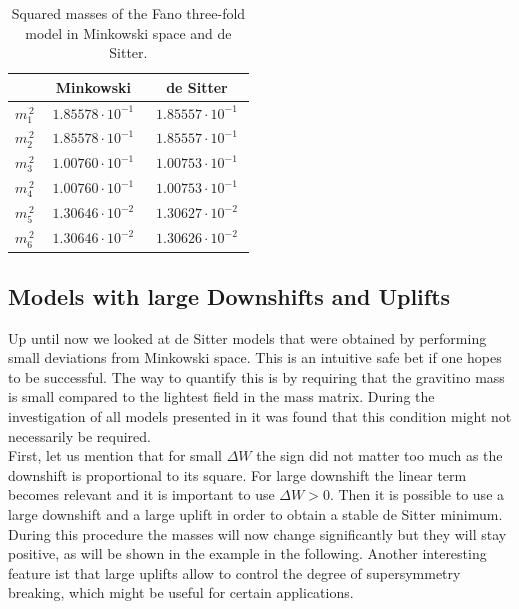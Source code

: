 \documentclass[12pt]{report}
\begin{document}
\begin{table}[htb]
\centering
\begin{tabular}{|c|c|c|}\hline
&  Minkowski  & de Sitter \\\hline
$m_1^{\,2}$ & $\; 1.85578 \cdot 10^{-1} \;$ & $\; 1.85557 \cdot 10^{-1} \;$\\\hline
$m_2^{\,2}$ & $\; 1.85578 \cdot 10^{-1} \;$ & $\; 1.85557 \cdot 10^{-1} \;$\\\hline
$m_3^{\,2}$ & $\; 1.00760 \cdot 10^{-1} \;$ & $\; 1.00753 \cdot 10^{-1} \;$\\\hline
$m_4^{\,2}$ & $\; 1.00760 \cdot 10^{-1} \;$ & $\; 1.00753 \cdot 10^{-1} \;$\\\hline
$m_5^{\,2}$ & $\; 1.30646 \cdot 10^{-2} \;$ & $\; 1.30627 \cdot 10^{-2} \;$\\\hline
$m_6^{\,2}$ & $\; 1.30646 \cdot 10^{-2} \;$ & $\; 1.30626 \cdot 10^{-2} \;$\\\hline
\end{tabular}
\caption{Squared masses of the Fano three-fold model in Minkowski space and de Sitter.}
\label{tab:swissmass}
\end{table}

\FloatBarrier
\subsection{Models with large Downshifts and Uplifts}
Up until now we looked at de Sitter models that were obtained by performing small deviations from Minkowski space. This is an intuitive safe bet if one hopes to be successful. The way to quantify this is by requiring that the gravitino mass is small compared to the lightest field in the mass matrix. During the investigation of all models presented in \cite{Cribiori:2019drf} it was found that this condition might not necessarily be required. \\
First, let us mention that for small $\Delta W$ the sign did not matter too much as the downshift is proportional to its square. For large downshift the linear term becomes relevant and it is important to use $\Delta W >0$. Then it is possible to use a large downshift and a large uplift in order to obtain a stable de Sitter minimum. During this procedure the masses will now change significantly but they will stay positive, as will be shown in the example in the following. Another interesting feature ist that large uplifts allow to control the degree of supersymmetry breaking, which might be useful for certain applications.\\
\end{document}
